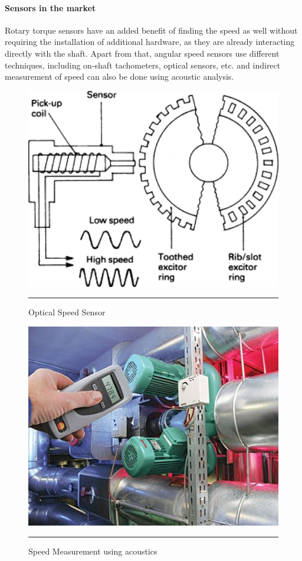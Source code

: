 \paragraph{Sensors in the market}
Rotary torque sensors have an added benefit of finding the speed as well without requiring the installation of additional hardware, as they are already interacting directly with the shaft. Apart from that, angular speed sensors use different techniques, including on-shaft tachometers, optical sensors, etc. and indirect measurement of speed can also be done using acoustic analysis.
\begin{figure}[htbp]
	\centering
		\includegraphics[width = 4.5in]{./Figures/MS/fig315.png}
		\rule{35em}{0.5pt}
	\caption{Optical Speed Sensor}
	\label{fig:Optical Speed Sensor} 
\end{figure}
\begin{figure}[htbp]
	\centering
		\includegraphics[width = 4.5in]{./Figures/MS/fig316.png}
		\rule{35em}{0.5pt}
	\caption{Speed Measurement using acoustics}
	\label{fig:Speed Measurement using acoustics} 
\end{figure}

